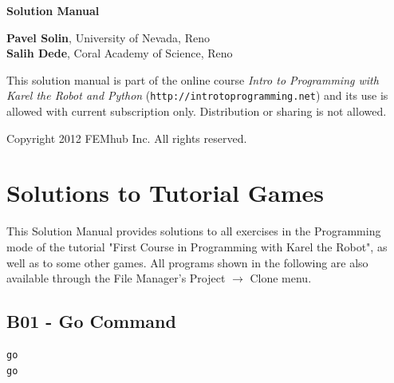 \documentclass[article,A4,12pt]{llncs}
\begin{document}
\begin{center}
\vspace{2.8cm}
{\huge \bf Solution Manual}
\end{center}
\vbox{}
\begin{center}
\vfill
{\large
{\bf Pavel Solin}, University of Nevada, Reno\\
{\bf Salih Dede}, Coral Academy of Science, Reno
}
\end{center}
\newpage
\vbox{}
\vfill
\begin{center}
{\large
This solution manual is part of the online course 
{\em Intro to Programming with Karel the Robot and Python} 
({\tt http://introtoprogramming.net}) and its use is allowed 
with current subscription only. Distribution or sharing is not allowed. \\
}
\vfill

Copyright 2012 FEMhub Inc. All rights reserved.
\end{center}




\section*{}
\small

\normalsize

\newpage
\setcounter{tocdepth}{2}
\tableofcontents

\newpage

\pagestyle{plain}
\setcounter{page}{1}


\section{Solutions to Tutorial Games}

This Solution Manual provides solutions to all exercises in the 
Programming mode of the tutorial "First Course in Programming with
Karel the Robot", as well as to some other games. All programs shown 
in the following are also available through the File Manager's Project 
$\rightarrow$ Clone menu.


\subsection{B01 - Go Command}
\begin{verbatim}
go
go
\end{verbatim}
\end{document}
